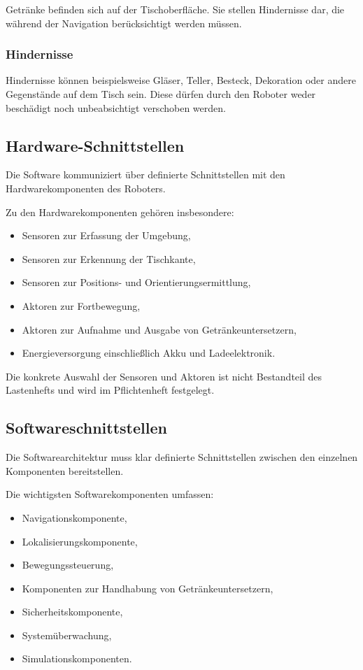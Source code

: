 Getränke befinden sich auf der Tischoberfläche. Sie stellen Hindernisse
dar, die während der Navigation berücksichtigt werden müssen.

\subsubsection{Hindernisse}\label{hindernisse}

Hindernisse können beispielsweise Gläser, Teller, Besteck, Dekoration
oder andere Gegenstände auf dem Tisch sein. Diese dürfen durch den
Roboter weder beschädigt noch unbeabsichtigt verschoben werden.

\subsection{Hardware-Schnittstellen}\label{hardware-schnittstellen}

Die Software kommuniziert über definierte Schnittstellen mit den
Hardwarekomponenten des Roboters.

Zu den Hardwarekomponenten gehören insbesondere:

\begin{itemize}
\tightlist
\item
  Sensoren zur Erfassung der Umgebung,
\item
  Sensoren zur Erkennung der Tischkante,
\item
  Sensoren zur Positions- und Orientierungsermittlung,
\item
  Aktoren zur Fortbewegung,
\item
  Aktoren zur Aufnahme und Ausgabe von Getränkeuntersetzern,
\item
  Energieversorgung einschließlich Akku und Ladeelektronik.
\end{itemize}

Die konkrete Auswahl der Sensoren und Aktoren ist nicht Bestandteil des
Lastenhefts und wird im Pflichtenheft festgelegt.

\subsection{Softwareschnittstellen}\label{softwareschnittstellen}

Die Softwarearchitektur muss klar definierte Schnittstellen zwischen den
einzelnen Komponenten bereitstellen.

Die wichtigsten Softwarekomponenten umfassen:

\begin{itemize}
\tightlist
\item
  Navigationskomponente,
\item
  Lokalisierungskomponente,
\item
  Bewegungssteuerung,
\item
  Komponenten zur Handhabung von Getränkeuntersetzern,
\item
  Sicherheitskomponente,
\item
  Systemüberwachung,
\item
  Simulationskomponenten.
\end{itemize}

